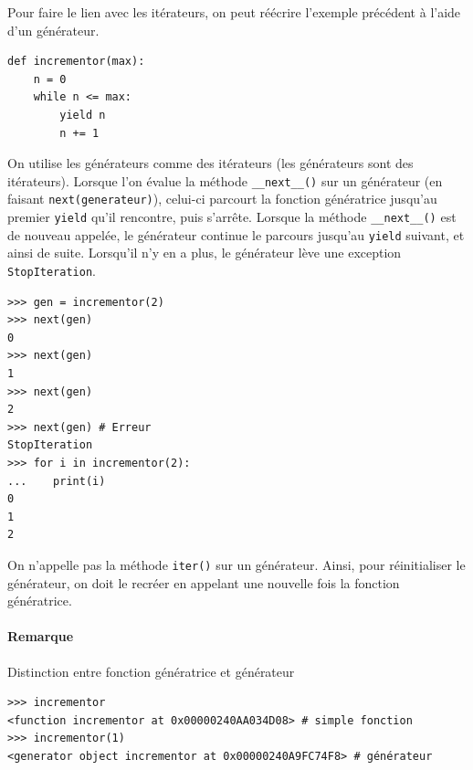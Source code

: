 \documentclass[a4paper, 10pt]{article}
\begin{document}
Pour faire le lien avec les itérateurs, on peut réécrire l'exemple précédent à l'aide d'un générateur.
\begin{verbatim}
def incrementor(max):
    n = 0
    while n <= max:
        yield n
        n += 1
\end{verbatim}

On utilise les générateurs comme des itérateurs (les générateurs sont des itérateurs). Lorsque l'on évalue la méthode \texttt{__next__()} sur un générateur (en faisant \texttt{next(generateur)}), celui-ci parcourt la fonction génératrice jusqu'au premier \texttt{yield} qu'il rencontre, puis s'arrête. Lorsque la méthode \texttt{__next__()} est de nouveau appelée, le générateur continue le parcours jusqu'au \texttt{yield} suivant, et ainsi de suite. Lorsqu'il n'y en a plus, le générateur lève une exception \texttt{StopIteration}.
\begin{verbatim}
>>> gen = incrementor(2)
>>> next(gen)
0
>>> next(gen)
1
>>> next(gen)
2
>>> next(gen) # Erreur
StopIteration
>>> for i in incrementor(2):
...    print(i)
0
1
2
\end{verbatim}

On n'appelle pas la méthode \texttt{iter()} sur un générateur. Ainsi, pour réinitialiser le générateur, on doit le recréer en appelant une nouvelle fois la fonction génératrice.

\paragraph{Remarque} Distinction entre fonction génératrice et générateur
\begin{verbatim}
>>> incrementor
<function incrementor at 0x00000240AA034D08> # simple fonction
>>> incrementor(1)
<generator object incrementor at 0x00000240A9FC74F8> # générateur
\end{verbatim}
\end{document}

